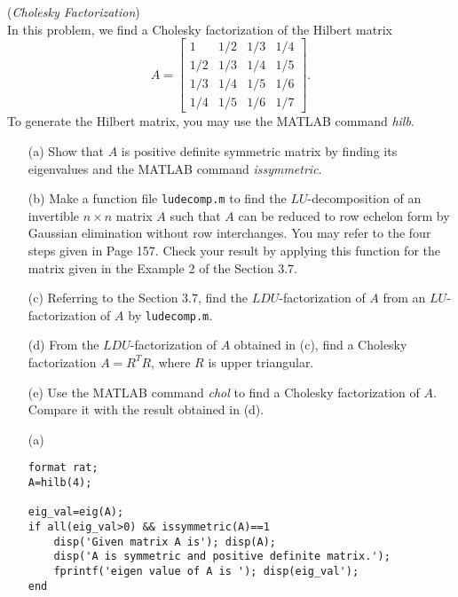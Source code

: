 \begin{exer}(\textit{Cholesky Factorization})\\
In this problem, we find a Cholesky factorization of the Hilbert matrix
$$A=\begin{bmatrix}1 & 1/2 & 1/3 & 1/4\\ 1/2 & 1/3 & 1/4 & 1/5 \\ 1/3 & 1/4 & 1/5 & 1/6 \\ 1/4 & 1/5 & 1/6 & 1/7\end{bmatrix}.$$
To generate the Hilbert matrix, you may use the MATLAB command \textit{hilb}.
\begin{enumerate}
\item[(a)] Show that $A$ is positive definite symmetric matrix by finding its eigenvalues and the MATLAB command \textit{issymmetric}.
\vspace{1mm}
\item[(b)] Make a function file \verb"ludecomp.m" to find the $LU$-decomposition of an invertible $n \times n$ matrix $A$ such that $A$ can be reduced to row echelon form by Gaussian elimination without row interchanges. You may refer to the four steps given in Page 157. Check your result by applying this function for the matrix given in the Example 2 of the Section 3.7.
\vspace{1mm}
\item[(c)] Referring to the Section 3.7, find the $LDU$-factorization of $A$ from an $LU$-factorization of $A$ by \verb"ludecomp.m".
\vspace{1mm}
\item[(d)] From the $LDU$-factorization of $A$ obtained in (c), find a Cholesky factorization $A=R^{T}R$, where $R$ is upper triangular.
\vspace{1mm}
\item[(e)] Use the MATLAB command \textit{chol} to find a Cholesky factorization of $A$. Compare it with the result obtained in (d).
\end{enumerate}


\begin{sol}
\verb""
\begin{enumerate}
\item[(a)]
\begin{verbatim}
format rat;
A=hilb(4);

eig_val=eig(A);
if all(eig_val>0) && issymmetric(A)==1
    disp('Given matrix A is'); disp(A);
    disp('A is symmetric and positive definite matrix.');
    fprintf('eigen value of A is '); disp(eig_val');
end
\end{verbatim}


\end{enumerate}
\end{sol}
\end{exer}
